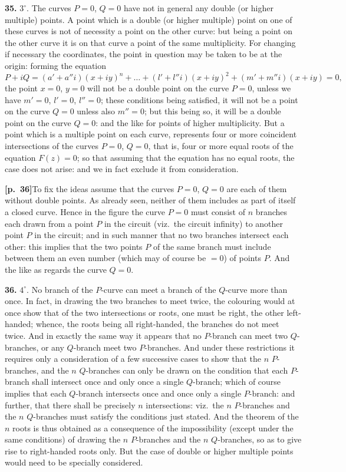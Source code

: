 \documentclass[11pt,a4paper]{article}
\begin{document}
\noindent\textbf{35.} $3^{\circ}$. The curves $P=0$, $Q=0$ have not in general any double (or higher multiple) points. A point which is a double (or higher multiple) point on one of these curves is not of necessity a point on the other curve: but being a point on the other curve it is on that curve a point of the same multiplicity. For changing if necessary the coordinates, the point in question may be taken to be at the origin: forming the equation
\[
P + iQ = (a' + a''i)(x+iy)^{n} + \ldots + (l' + l''i)(x+iy)^{2} + (m' + m''i)(x+iy) = 0,
\]
the point $x=0$, $y=0$ will not be a double point on the curve $P=0$, unless we have $m'=0$, $l'=0$, $l''=0$; these conditions being satisfied, it will not be a point on the curve $Q=0$ unless also $m''=0$; but this being so, it will be a double point on the curve $Q=0$: and the like for points of higher multiplicity. But a point which is a multiple point on each curve, represents four or more coincident intersections of the curves $P=0$, $Q=0$, that is, four or more equal roots of the equation $F(z)=0$; so that assuming that the equation has no equal roots, the case does not arise: and we in fact exclude it from consideration.

\bigskip

\noindent\textbf{[p.~36]}\quad To fix the ideas assume that the curves $P=0$, $Q=0$ are each of them without double points. As already seen, neither of them includes as part of itself a closed curve. Hence in the figure the curve $P=0$ must consist of $n$ branches each drawn from a point $P$ in the circuit (viz.\ the circuit infinity) to another point $P$ in the circuit; and in such manner that no two branches intersect each other: this implies that the two points $P$ of the same branch must include between them an even number (which may of course be $=0$) of points $P$. And the like as regards the curve $Q=0$.

\medskip

\noindent\textbf{36.} $4^{\circ}$. No branch of the $P$-curve can meet a branch of the $Q$-curve more than once. In fact, in drawing the two branches to meet twice, the colouring would at once show that of the two intersections or roots, one must be right, the other left-handed; whence, the roots being all right-handed, the branches do not meet twice. And in exactly the same way it appears that no $P$-branch can meet two $Q$-branches, or any $Q$-branch meet two $P$-branches. And under these restrictions it requires only a consideration of a few successive cases to show that the $n$ $P$-branches, and the $n$ $Q$-branches can only be drawn on the condition that each $P$-branch shall intersect once and only once a single $Q$-branch; which of course implies that each $Q$-branch intersects once and once only a single $P$-branch: and further, that there shall be precisely $n$ intersections: viz.\ the $n$ $P$-branches and the $n$ $Q$-branches must satisfy the conditions just stated. And the theorem of the $n$ roots is thus obtained as a consequence of the impossibility (except under the same conditions) of drawing the $n$ $P$-branches and the $n$ $Q$-branches, so as to give rise to right-handed roots only. But the case of double or higher multiple points would need to be specially considered.
\end{document}
